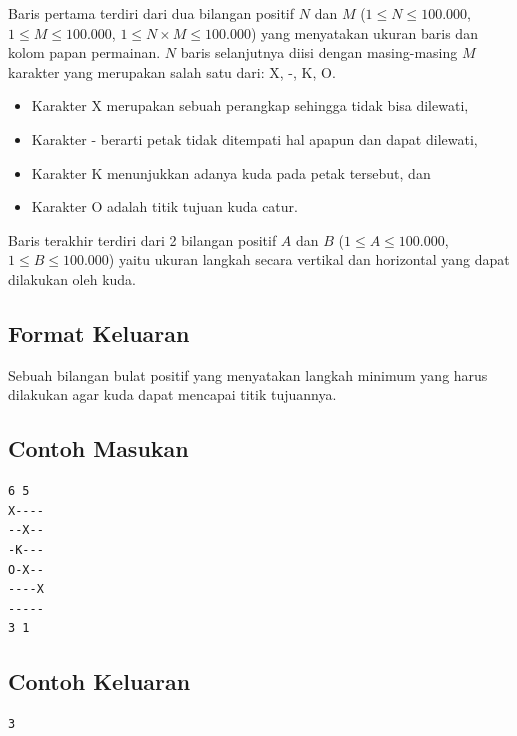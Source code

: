 \documentclass{article}
\begin{document}
Baris pertama terdiri dari dua bilangan positif $N$ dan $M$ ($1 \leq N \leq 100.000$, $1 \leq M \leq 100.000$, $1 \leq N \times M \leq 100.000$) yang menyatakan ukuran baris dan kolom papan permainan.
$N$ baris selanjutnya diisi dengan masing-masing $M$ karakter yang merupakan salah satu dari: X, -, K, O.

\begin{itemize}
    \setlength\itemsep{0pt}
    \item Karakter X merupakan sebuah perangkap sehingga tidak bisa dilewati,
    \item Karakter - berarti petak tidak ditempati hal apapun dan dapat dilewati,
    \item Karakter K menunjukkan adanya kuda pada petak tersebut, dan
    \item Karakter O adalah titik tujuan kuda catur.
\end{itemize}

Baris terakhir terdiri dari 2 bilangan positif $A$ dan $B$ ($1 \leq A \leq 100.000$, $1 \leq B \leq 100.000$) yaitu ukuran langkah secara vertikal dan horizontal yang dapat dilakukan oleh kuda.

\subsection*{Format Keluaran}

Sebuah bilangan bulat positif yang menyatakan  langkah minimum yang harus dilakukan agar kuda dapat mencapai titik tujuannya.
\\

\begin{multicols}{2}
\subsection*{Contoh Masukan}
\begin{lstlisting}
6 5
X----
--X--
-K---
O-X--
----X
-----
3 1
\end{lstlisting}
\columnbreak
\subsection*{Contoh Keluaran}
\begin{lstlisting}
3
\end{lstlisting}
\vfill
\null
\end{multicols}


\pagebreak
\end{document}
